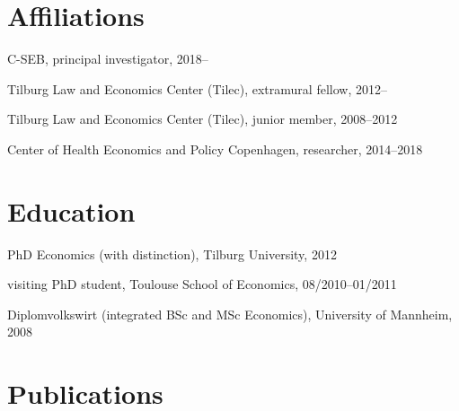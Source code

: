 \documentclass[a4paper]{article}
\renewenvironment{itemize}{
  \begin{list}{}{
    \setlength{\leftmargin}{1.5em}
  }
}{
  \end{list}
}
\begin{document}
\section*{Affiliations}
\begin{itemize}
\item C-SEB, principal investigator, 2018--
\item Tilburg Law and Economics Center (Tilec), extramural fellow, 2012--
\item Tilburg Law and Economics Center (Tilec), junior member, 2008--2012
\item Center of Health Economics and Policy Copenhagen, researcher, 2014--2018
\end{itemize}

\section*{Education}

\begin{itemize}
   \item PhD Economics (with distinction), Tilburg University, 2012

   \item visiting PhD student, Toulouse School of Economics, 08/2010--01/2011

   \item Diplomvolkswirt (integrated BSc and MSc Economics), University of Mannheim, 2008
\end{itemize}


\section*{Publications}
\end{document}
